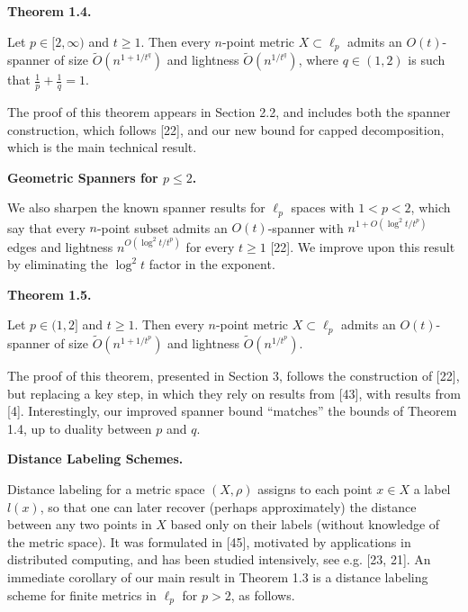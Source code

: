 \documentclass[10pt,a4paper]{amsart}
\begin{document}
\par
\par
\par\medskip\noindent\textbf{Theorem 1.4.}\par
Let $p\in[2,\infty)$ and $t\geq 1$. Then every $n$-point metric $X\subset\ell_{p}$ admits an $O(t)$-spanner of size $\tilde{O}\left(n^{1+1/t^{q}}\right)$ and lightness $\tilde{O}\left(n^{1/t^{q}}\right)$, where $q\in(1,2)$ is such that $\frac{1}{p}+\frac{1}{q}=1$.
\par
\par
\par
The proof of this theorem appears in Section 2.2, and includes both the spanner construction, which follows [22], and our new bound for capped decomposition, which is the main technical result.
\par
\par
\par
\par\medskip\noindent\textbf{Geometric Spanners for $p\leq 2$.}\par
We also sharpen the known spanner results for $\ell_{p}$ spaces with $1<p<2$, which say that every $n$-point subset admits an $O(t)$-spanner with $n^{1+O(\log^{2}{t}/t^{p})}$ edges and lightness $n^{O(\log^{2}{t}/t^{p})}$ for every $t\geq 1$ [22]. We improve upon this result by eliminating the $\log^{2}{t}$ factor in the exponent.
\par
\par
\par\medskip\noindent\textbf{Theorem 1.5.}\par
Let $p\in(1,2]$ and $t\geq 1$. Then every $n$-point metric $X\subset\ell_{p}$ admits an $O(t)$-spanner of size $\tilde{O}(n^{1+1/t^{p}})$ and lightness $\tilde{O}(n^{1/t^{p}})$.
\par
\par
\par
The proof of this theorem, presented in Section 3, follows the construction of [22], but replacing a key step, in which they rely on results from [43], with results from [4]. Interestingly, our improved spanner bound “matches” the bounds of Theorem 1.4, up to duality between $p$ and $q$.
\par
\par
\par
\par\medskip\noindent\textbf{Distance Labeling Schemes.}\par
Distance labeling for a metric space $(X,\rho)$ assigns to each point $x\in X$ a label $l(x)$, so that one can later recover (perhaps approximately) the distance between any two points in $X$ based only on their labels (without knowledge of the metric space). It was formulated in [45], motivated by applications in distributed computing, and has been studied intensively, see e.g. [23, 21]. An immediate corollary of our main result in Theorem 1.3 is a distance labeling scheme for finite metrics in $\ell_{p}$ for $p>2$, as follows.
\end{document}

